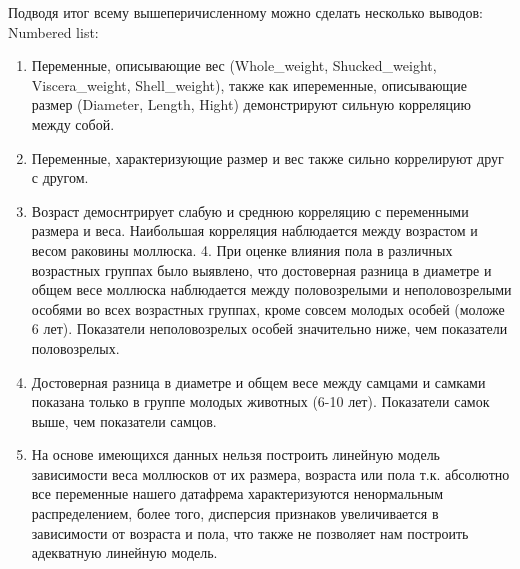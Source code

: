 \documentclass[]{article}
\providecommand{\tightlist}{%
  \setlength{\itemsep}{0pt}\setlength{\parskip}{0pt}}
\begin{document}
Подводя итог всему вышеперичисленному можно сделать несколько выводов:\\

Numbered list:

\begin{enumerate}
\def\labelenumi{\arabic{enumi}.}
\tightlist
\item
  Переменные, описывающие вес (Whole\_weight, Shucked\_weight,
  Viscera\_weight, Shell\_weight), также как ипеременные, описывающие
  размер (Diameter, Length, Hight) демонстрируют сильную корреляцию
  между собой.\\
\item
  Переменные, характеризующие размер и вес также сильно коррелируют друг
  с другом.\\
\item
  Возраст демоснтрирует слабую и среднюю корреляцию с переменными
  размера и веса. Наибольшая корреляция наблюдается между возрастом и
  весом раковины моллюска. 4. При оценке влияния пола в различных
  возрастных группах было выявлено, что достоверная разница в диаметре и
  общем весе моллюска наблюдается между половозрелыми и неполовозрелыми
  особями во всех возрастных группах, кроме совсем молодых особей
  (моложе 6 лет). Показатели неполовозрелых особей значительно ниже, чем
  показатели половозрелых.
\item
  Достоверная разница в диаметре и общем весе между самцами и самками
  показана только в группе молодых животных (6-10 лет). Показатели самок
  выше, чем показатели самцов.
\item
  На основе имеющихся данных нельзя построить линейную модель
  зависимости веса моллюсков от их размера, возраста или пола т.к.
  абсолютно все переменные нашего датафрема характеризуются ненормальным
  распределением, более того, дисперсия признаков увеличивается в
  зависимости от возраста и пола, что также не позволяет нам построить
  адекватную линейную модель.
\end{enumerate}
\end{document}
